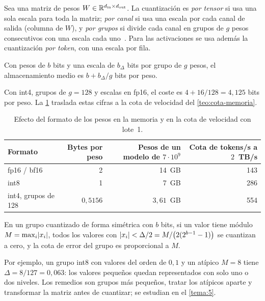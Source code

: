 \begin{definicion}[Granularidad]\label{def:granularidad}
Sea una matriz de pesos $W\in\mathbb{R}^{d_{\mathrm{in}}\times d_{\mathrm{out}}}$. La cuantización es \emph{por tensor} si usa una sola escala para toda la matriz; \emph{por canal} si usa una escala por cada canal de salida (columna de $W$), y \emph{por grupos} si divide cada canal en grupos de $g$ pesos consecutivos con una escala cada uno~\cite[§2]{smoothquant}. Para las activaciones se usa además la cuantización \emph{por token}, con una escala por fila.
\end{definicion}

\begin{proposicion}\label{prop:bits-grupo}
Con pesos de $b$ bits y una escala de $b_\Delta$ bits por grupo de $g$ pesos, el almacenamiento medio es $b+b_\Delta/g$ bits por peso.
\end{proposicion}

Con int4, grupos de $g=128$ y escalas en fp16, el coste es $4+16/128=4{,}125$ bits por peso. La \cref{tab:formatos} traslada estas cifras a la cota de velocidad del \cref{teo:cota-memoria}.

\begin{table}[h]
\centering\small
\begin{tabular}{@{}lrrr@{}}
\toprule
Formato & Bytes por peso & Pesos de un modelo de $7\cdot 10^{9}$ & Cota de tokens/s a $2$~TB/s \\
\midrule
fp16 / bf16 & 2 & 14~GB & 143 \\
int8 & 1 & 7~GB & 286 \\
int4, grupos de 128 & $0{,}5156$ & $3{,}61$~GB & 554 \\
\bottomrule
\end{tabular}
\caption{Efecto del formato de los pesos en la memoria y en la cota de velocidad con lote~1.}
\label{tab:formatos}
\end{table}

\begin{proposicion}\label{prop:atipico}
En un grupo cuantizado de forma simétrica con $b$ bits, si un valor tiene módulo $M=\max_i\lvert x_i\rvert$, todos los valores con $\lvert x_i\rvert<\Delta/2=M/\bigl(2(2^{b-1}-1)\bigr)$ se cuantizan a cero, y la cota de error del grupo es proporcional a $M$.
\end{proposicion}

Por ejemplo, un grupo int8 con valores del orden de $0{,}1$ y un atípico $M=8$ tiene $\Delta=8/127=0{,}063$: los valores pequeños quedan representados con solo uno o dos niveles. Los remedios son grupos más pequeños, tratar los atípicos aparte y transformar la matriz antes de cuantizar; se estudian en el \cref{tema:5}.

